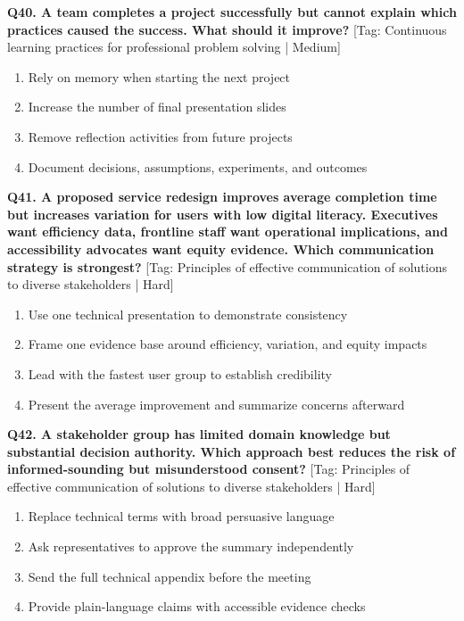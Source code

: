 \noindent\textbf{Q40. A team completes a project successfully but cannot explain which practices caused the success. What should it improve?} \hfill [Tag: Continuous learning practices for professional problem solving | Medium]
\begin{enumerate}[label=(\alph*),topsep=2pt,itemsep=1pt,partopsep=0pt,parsep=0pt]
    \item {Rely on memory when starting the next project}
    \item {Increase the number of final presentation slides}
    \item {Remove reflection activities from future projects}
    \item {Document decisions, assumptions, experiments, and outcomes}
\end{enumerate}
\vspace{2mm}

\noindent\textbf{Q41. A proposed service redesign improves average completion time but increases variation for users with low digital literacy. Executives want efficiency data, frontline staff want operational implications, and accessibility advocates want equity evidence. Which communication strategy is strongest?} \hfill [Tag: Principles of effective communication of solutions to diverse stakeholders | Hard]
\begin{enumerate}[label=(\alph*),topsep=2pt,itemsep=1pt,partopsep=0pt,parsep=0pt]
    \item {Use one technical presentation to demonstrate consistency}
    \item {Frame one evidence base around efficiency, variation, and equity impacts}
    \item {Lead with the fastest user group to establish credibility}
    \item {Present the average improvement and summarize concerns afterward}
\end{enumerate}
\vspace{2mm}

\noindent\textbf{Q42. A stakeholder group has limited domain knowledge but substantial decision authority. Which approach best reduces the risk of informed-sounding but misunderstood consent?} \hfill [Tag: Principles of effective communication of solutions to diverse stakeholders | Hard]
\begin{enumerate}[label=(\alph*),topsep=2pt,itemsep=1pt,partopsep=0pt,parsep=0pt]
    \item {Replace technical terms with broad persuasive language}
    \item {Ask representatives to approve the summary independently}
    \item {Send the full technical appendix before the meeting}
    \item {Provide plain-language claims with accessible evidence checks}
\end{enumerate}
\vspace{2mm}

